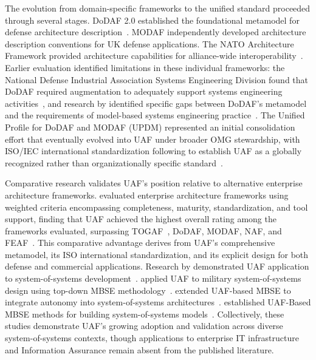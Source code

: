 The evolution from domain-specific frameworks to the unified standard proceeded through several stages. DoDAF 2.0 established the foundational metamodel for defense architecture description~\parencite{DoDAF_2009}. MODAF independently developed architecture description conventions for UK defense applications. The NATO Architecture Framework provided architecture capabilities for alliance-wide interoperability~\parencite{NATO_NAF_2018}. Earlier evaluation identified limitations in these individual frameworks: the National Defense Industrial Association Systems Engineering Division found that DoDAF required augmentation to adequately support systems engineering activities~\parencite{NDIA_SE_DoDAF_2011}, and research by \citeauthor{Hause_2010} identified specific gaps between DoDAF's metamodel and the requirements of model-based systems engineering practice~\parencite{Hause_2010}. The Unified Profile for DoDAF and MODAF (UPDM) represented an initial consolidation effort that eventually evolved into UAF under broader OMG stewardship, with ISO/IEC international standardization following to establish UAF as a globally recognized rather than organizationally specific standard~\parencite{OMG_UAF_UPDM_2017}.

Comparative research validates UAF's position relative to alternative enterprise architecture frameworks. \citeauthor{Bankauskaite_2019} evaluated enterprise architecture frameworks using weighted criteria encompassing completeness, maturity, standardization, and tool support, finding that UAF achieved the highest overall rating among the frameworks evaluated, surpassing TOGAF~\parencite{TOGAF_2018}, DoDAF, MODAF, NAF, and FEAF~\parencite{Bankauskaite_2019}. This comparative advantage derives from UAF's comprehensive metamodel, its ISO international standardization, and its explicit design for both defense and commercial applications. Research by \citeauthor{Eichmann_Melzer_God_2019} demonstrated UAF application to system-of-systems development~\parencite{Eichmann_Melzer_God_2019}. \citeauthor{Liu_2023} applied UAF to military system-of-systems design using top-down MBSE methodology~\parencite{Liu_2023}. \citeauthor{Torkjazi_2024} extended UAF-based MBSE to integrate autonomy into system-of-systems architectures~\parencite{Torkjazi_2024}. \citeauthor{Abhaya_2021} established UAF-Based MBSE methods for building system-of-systems models~\parencite{Abhaya_2021}. Collectively, these studies demonstrate UAF's growing adoption and validation across diverse system-of-systems contexts, though applications to enterprise IT infrastructure and Information Assurance remain absent from the published literature.

